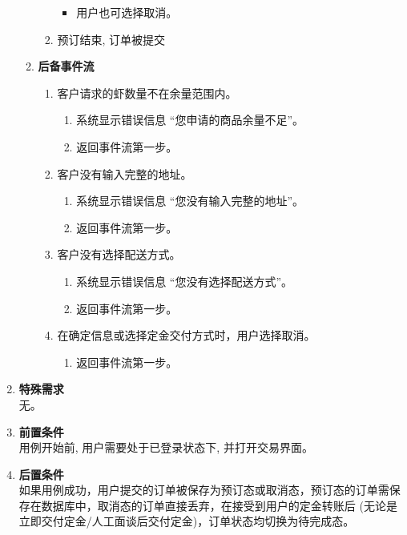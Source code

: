 \begin{enumerate}
\begin{enumerate}
\begin{enumerate}
\begin{itemize}
                \item 用户也可选择取消。
            \end{itemize}
            \item 预订结束, 订单被提交
        \end{enumerate}
        \item \textbf{后备事件流}
        \begin{enumerate}
            \item 客户请求的虾数量不在余量范围内。
            \begin{enumerate}
                \item 系统显示错误信息 “您申请的商品余量不足”。
                \item 返回事件流第一步。
            \end{enumerate}
            \item 客户没有输入完整的地址。
            \begin{enumerate}
                \item 系统显示错误信息 “您没有输入完整的地址”。
                \item 返回事件流第一步。
            \end{enumerate}
            \item 客户没有选择配送方式。
            \begin{enumerate}
                \item 系统显示错误信息 “您没有选择配送方式”。
                \item 返回事件流第一步。
            \end{enumerate}
            \item 在确定信息或选择定金交付方式时，用户选择取消。
            \begin{enumerate}
                \item 返回事件流第一步。
            \end{enumerate}
        \end{enumerate}
    \end{enumerate}
    \item \textbf{特殊需求} \\ 无。
    \item \textbf{前置条件} \\ 用例开始前, 用户需要处于已登录状态下, 并打开交易界面。
    \item \textbf{后置条件} \\ 如果用例成功，用户提交的订单被保存为预订态或取消态，预订态的订单需保存在数据库中，取消态的订单直接丢弃，在接受到用户的定金转账后 (无论是立即交付定金/人工面谈后交付定金)，订单状态均切换为待完成态。
\end{enumerate}



